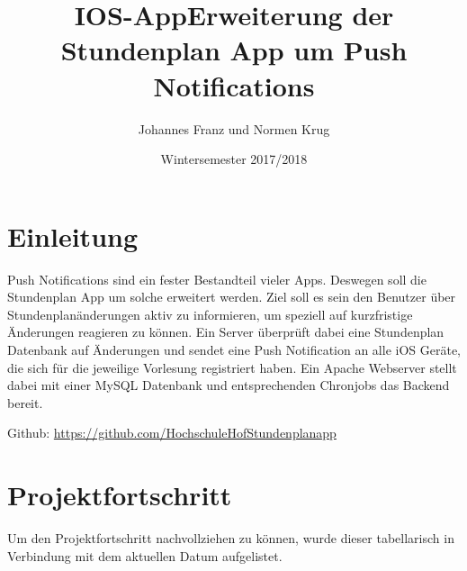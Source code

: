 \documentclass{article}
\begin{document}
\begin{titlepage}
\title{IOS-App}
\author{Johannes Franz und Normen Krug} 
	\title{Erweiterung der Stundenplan App um \newline Push Notifications}
	\date{Wintersemester 2017/2018} 
	\maketitle 
\end{titlepage}
\renewcommand{\contentsname}{Inhaltsverzeichnis}
\tableofcontents 
\newpage

\section{Einleitung}
Push Notifications sind ein fester Bestandteil vieler Apps. Deswegen soll die Stundenplan App um solche erweitert werden. Ziel soll es sein den Benutzer über Stundenplanänderungen aktiv zu informieren, um speziell auf kurzfristige Änderungen reagieren zu können. Ein Server überprüft dabei eine Stundenplan Datenbank auf Änderungen und sendet eine Push Notification an alle iOS Geräte, die sich für die jeweilige Vorlesung registriert haben. Ein Apache Webserver stellt dabei mit einer MySQL Datenbank und entsprechenden Chronjobs das Backend bereit.

Github: \url{https://github.com/HochschuleHofStundenplanapp}



\section{Projektfortschritt}
Um den Projektfortschritt nachvollziehen zu können, wurde dieser tabellarisch in Verbindung mit dem aktuellen Datum aufgelistet.\\
\end{document}
